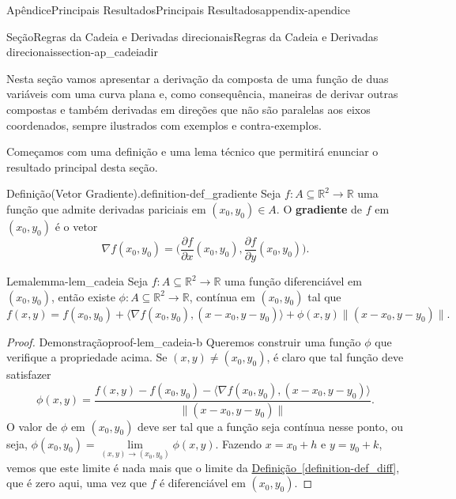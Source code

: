 \documentclass[oneside,10pt,]{book}
\newcommand{\xreffont}{\relax}
\newcommand{\terminology}[1]{\textbf{#1}}
\numberwithin{equation}{section}
\newcommand{\R}{\mathbb R}
\begin{document}
\begin{appendixptx}{Apêndice}{Principais Resultados}{}{Principais Resultados}{}{}{appendix-apendice}
\typeout{************************************************}
%
\begin{sectionptx}{Seção}{Regras da Cadeia e Derivadas direcionais}{}{Regras da Cadeia e Derivadas direcionais}{}{}{section-ap_cadeiadir}
\begin{introduction}{}%
Nesta seção vamos apresentar a derivação da composta de uma função de duas variáveis com uma curva plana e, como consequência, maneiras de derivar outras compostas e também derivadas em direções que não são paralelas aos eixos coordenados, sempre ilustrados com exemplos e contra-exemplos.%
\end{introduction}%
Começamos com uma definição e uma lema técnico que permitirá enunciar o resultado principal desta seção.%
\begin{definition}{Definição}{(Vetor Gradiente).}{definition-def_gradiente}%
Seja \(f\colon A\subseteq\R^2\to\R\) uma função que admite derivadas pariciais em \((x_0,y_0)\in A\). O \terminology{gradiente} de \(f\) em \((x_0,y_0)\) é o vetor%
\begin{equation*}
\nabla f(x_0,y_0)=\Big(\dfrac{\partial f}{\partial
x}(x_0,y_0),\dfrac{\partial f}{\partial y}(x_0,y_0)\Big).
\end{equation*}
%
\end{definition}
\begin{lemma}{Lema}{}{}{lemma-lem_cadeia}%
Seja \(f\colon A\subseteq\R^2\to\R\) uma função diferenciável em \((x_0,y_0)\), então existe \(\phi\colon
A\subseteq\R^2\to\R\), contínua em \((x_0,y_0)\) tal que%
\begin{equation*}
f(x,y)=f(x_0,y_0)+\big\langle\nabla
f(x_0,y_0),(x-x_0,y-y_0)\big\rangle+\phi(x,y)\big\|(x-x_0,y-y_0)\big\|.
\end{equation*}
%
\end{lemma}
\begin{proof}{Demonstração}{}{proof-lem_cadeia-b}
Queremos construir uma função \(\phi\) que verifique a propriedade acima. Se \((x,y)\neq (x_0,y_0)\), é claro que tal função deve satisfazer%
\begin{equation*}
\phi(x,y)=\dfrac{f(x,y)-f(x_0,y_0)-\big\langle\nabla
f(x_0,y_0),(x-x_0,y-y_0)\big\rangle}{\big\|(x-x_0,y-y_0)\big\|}.
\end{equation*}
O valor de \(\phi\) em \((x_0,y_0)\) deve ser tal que a função seja contínua nesse ponto, ou seja, \(\phi(x_0,y_0)=\lim\limits_{(x,y)\to (x_0,y_0)}
\phi(x,y)\). Fazendo \(x=x_0+h\) e \(y=y_0+k\), vemos que este limite é nada mais que o limite da \hyperref[definition-def_diff]{Definição~{\xreffont\ref{definition-def_diff}}}, que é zero aqui, uma vez que \(f\) é diferenciável em \((x_0,y_0)\).%

\end{proof}
\end{sectionptx}
\end{appendixptx}
\end{document}
